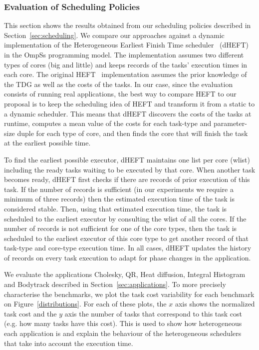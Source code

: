 \subsubsection{Evaluation of Scheduling Policies}
This section shows the results obtained from our scheduling policies described in Section~\ref{sec:scheduling}.
We compare our approaches against a dynamic implementation of the Heterogeneous Earliest Finish Time scheduler~\cite{HEFT} (dHEFT) in the OmpSs programming model.
The implementation assumes two different types of cores (big and
little) and keeps records of the tasks’ execution times in each core. The original HEFT~\cite{HEFT} implementation assumes the
prior knowledge of the TDG as well as the costs of the tasks.
In our case, since the evaluation consists of running real applications, the best way to compare HEFT to our proposal is
to keep the scheduling idea of HEFT and transform it from
a static to a dynamic scheduler. This means that dHEFT
discovers the costs of the tasks at runtime, computes a mean
value of the costs for each task-type and parameter-size duple for each type of core, and then finds the core that will
finish the task at the earliest possible time. 

To find the earliest possible executor, dHEFT maintains
one list per core (wlist) including the ready tasks waiting
to be executed by that core. When another task becomes
ready, dHEFT first checks if there are records of prior execution of this task. If the number of records is sufficient
(in our experiments we require a minimum of three records)
then the estimated execution time of the task is considered
stable. Then, using that estimated execution time, the task
is scheduled to the earliest executor by consulting the wlist
of all the cores. If the number of records is not sufficient
for one of the core types, then the task is scheduled to the
earliest executor of this core type to get another record of
that task-type and core-type execution time. In all cases,
dHEFT updates the history of records on every task execution to adapt for phase changes in the application.

We evaluate the applications Cholesky, QR, Heat diffusion, Integral Histogram and Bodytrack described in Section~\ref{sec:applications}.
To more precisely characterise the benchmarks, we plot the task cost variability for each benchmark on Figure~\ref{distributions}.
For each of these plots, the $x$ axis shows the normalized task cost and the $y$ axis the number of tasks that correspond to this task cost (e.g. how many tasks have this cost).
This is used to show how heterogeneous each application is and explain the behaviour of the heterogeneous schedulers that take into account the execution time.

